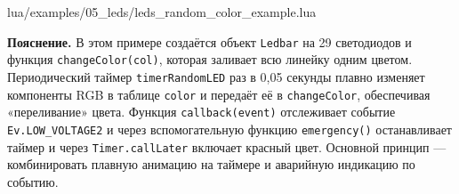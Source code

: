 \begin{codefile}{lua/examples/05_leds/leds_random_color_example.lua}
\end{codefile}

\textbf{Пояснение.} В этом примере создаётся объект \verb|Ledbar| на 29 светодиодов и функция \verb|changeColor(col)|, которая заливает всю линейку одним цветом. Периодический таймер \verb|timerRandomLED| раз в 0{,}05 секунды плавно изменяет компоненты RGB в таблице \verb|color| и передаёт её в \verb|changeColor|, обеспечивая «переливание» цвета. Функция \verb|callback(event)| отслеживает событие \verb|Ev.LOW_VOLTAGE2| и через вспомогательную функцию \verb|emergency()| останавливает таймер и через \verb|Timer.callLater| включает красный цвет. Основной принцип — комбинировать плавную анимацию на таймере и аварийную индикацию по событию.
